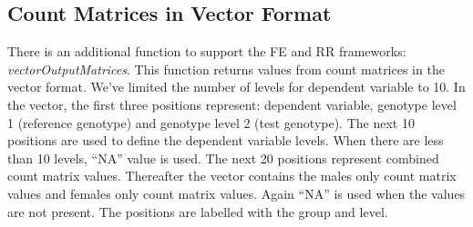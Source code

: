 \documentclass[12pt,a4paper]{article}
\begin{document}
\subsection{Count Matrices in Vector Format}
There is an additional function to support the FE and RR frameworks: \textit{vectorOutputMatrices}. This function returns values from count matrices in the vector format.
We've limited the number of levels for dependent variable to 10. 
In the vector, the first three positions represent: dependent variable, genotype level 1 (reference genotype) and genotype level 2 (test genotype).
The next 10 positions are used to define the dependent variable levels. When there are less than 10 levels, ``NA'' value is used.
The next 20 positions represent combined count matrix values. Thereafter the vector contains the males only count matrix values and females only count matrix values. Again ``NA'' is used when the values are not present. The positions are labelled with the group and level.
\end{document}
